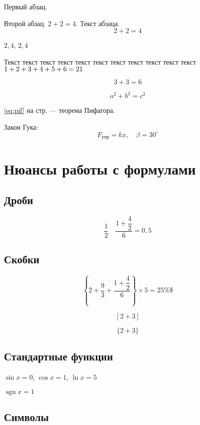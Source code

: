 \documentclass[a4paper,14pt]{extarticle}
\newcommand*{\hm}[1]{#1\nobreak\discretionary{}
	{\hbox{$\mathsurround=0pt #1$}}{}}
\DeclareMathOperator{\sgn}{\mathop{sgn}}
\begin{document}
Первый         абзац.

Второй абзац.
$2 +    2 =   4$. Текст абзаца.
\[  2+2=4  \]

$2,4$, \hspace{1em} $2, 4$

\vspace{1em}

Текст текст текст текст текст текст текст текст текст текст текст $1\hm{+}2+3+4+5+6=21$

\begin{equation}
	3+3 = 6
\end{equation}

\begin{equation}
	a^2 + b^2 = c^2
	\label{eq:pif}
\end{equation}


\eqref{eq:pif}  на стр. \pageref{eq:pif} --- теорема Пифагора.

Закон Гука:
\[
F_{\text{упр}} = kx, \hspace{1em} \beta = 30^\circ
\]

\section{Нюансы работы с формулами}

\subsection{Дроби}

\[ \frac{1}{2} \hspace{1em} \frac{1+\dfrac{4}{2}}{6} = 0,5\]

\subsection{Скобки}

\[ \left\{2+\frac{9}{3} + \frac{1+\dfrac{4}{2}}{6}\right\} \times 5 = 25 \% \$ \]

\[  [2+3]  \]

\[ \{2+3\}  \]

\subsection{Стандартные функции}

$\sin x = 0$, $\cos x = 1$, $\ln x = 5$

$\sgn  x = 1$

\subsection{Символы}
\end{document}
